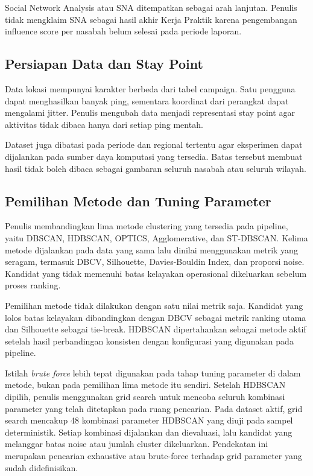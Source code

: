 Social Network Analysis atau SNA ditempatkan sebagai arah lanjutan. Penulis tidak mengklaim SNA sebagai hasil akhir Kerja Praktik karena pengembangan influence score per nasabah belum selesai pada periode laporan.

\subsection{Persiapan Data dan Stay Point}
Data lokasi mempunyai karakter berbeda dari tabel campaign. Satu pengguna dapat menghasilkan banyak ping, sementara koordinat dari perangkat dapat mengalami jitter. Penulis mengubah data menjadi representasi stay point agar aktivitas tidak dibaca hanya dari setiap ping mentah.

Dataset juga dibatasi pada periode dan regional tertentu agar eksperimen dapat dijalankan pada sumber daya komputasi yang tersedia. Batas tersebut membuat hasil tidak boleh dibaca sebagai gambaran seluruh nasabah atau seluruh wilayah.

\subsection{Pemilihan Metode dan Tuning Parameter}
Penulis membandingkan lima metode clustering yang tersedia pada pipeline, yaitu DBSCAN, HDBSCAN, OPTICS, Agglomerative, dan ST-DBSCAN. Kelima metode dijalankan pada data yang sama lalu dinilai menggunakan metrik yang seragam, termasuk DBCV, Silhouette, Davies-Bouldin Index, dan proporsi noise. Kandidat yang tidak memenuhi batas kelayakan operasional dikeluarkan sebelum proses ranking.

Pemilihan metode tidak dilakukan dengan satu nilai metrik saja. Kandidat yang lolos batas kelayakan dibandingkan dengan DBCV sebagai metrik ranking utama dan Silhouette sebagai tie-break. HDBSCAN dipertahankan sebagai metode aktif setelah hasil perbandingan konsisten dengan konfigurasi yang digunakan pada pipeline.

Istilah \textit{brute force} lebih tepat digunakan pada tahap tuning parameter di dalam metode, bukan pada pemilihan lima metode itu sendiri. Setelah HDBSCAN dipilih, penulis menggunakan grid search untuk mencoba seluruh kombinasi parameter yang telah ditetapkan pada ruang pencarian. Pada dataset aktif, grid search mencakup 48 kombinasi parameter HDBSCAN yang diuji pada sampel deterministik. Setiap kombinasi dijalankan dan dievaluasi, lalu kandidat yang melanggar batas noise atau jumlah cluster dikeluarkan. Pendekatan ini merupakan pencarian exhaustive atau brute-force terhadap grid parameter yang sudah didefinisikan.

